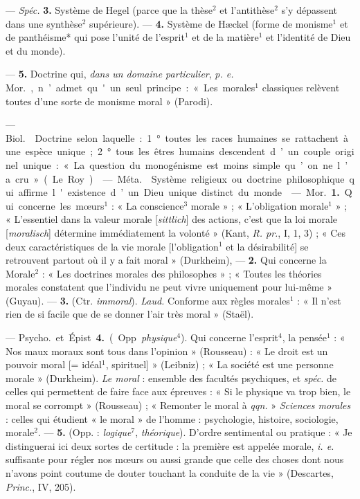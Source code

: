\begin{itemize}[leftmargin=1cm, label=, itemsep=1pt]
— {\it Spéc.} {\bf 3.} Système de Hegel (parce que la thèse$^2$ et
l’antithèse$^2$ s'y dépassent dans une synthèse$^2$ supérieure). — {\bf 4.}
Système de Hæckel (forme de monisme$^1$ et de panthéisme* qui pose l’unité de
l'esprit$^1$ et de la matière$^1$ et l'identité de Dieu et du monde).

— {\bf 5.} Doctrine qui, {\it dans un domaine particulier}, {\it p. e.}
\si{Mor.}, n’admet qu'un seul principe : « Les morales$^1$ classiques
relèvent toutes d’une sorte de monisme moral » (Parodi).

 — \si{Biol.}  Doctrine selon laquelle : 1°
toutes les races humaines se rattachent à une espèce unique; 2° tous les
êtres humains descendent d’un couple originel unique : « La question du
monogénisme est moins simple qu’on ne l’a cru » (Le Roy).

 — \si{Méta.}  Système religieux ou doctrine
philosophique qui affirme l'existence d’un Dieu unique distinct du monde.

 — \si{Mor.} {\bf 1.} Qui concerne les mœurs$^1$ : « La
conscience$^3$ morale » ;
« L'obligation morale$^1$ » ; « L’essentiel dans la valeur morale
[{\it sittlich}] des actions, c’est que la loi morale [{\it moralisch}]
détermine immédiatement la volonté » (Kant, {\it R. pr.}, I, 1, 3) ; « Ces
deux caractéristiques de la vie morale [l’obligation$^1$ et la désirabilité]
se retrouvent partout où il y a fait moral » (Durkheim), — {\bf 2.} Qui
concerne la Morale$^2$ : « Les doctrines morales des philosophes » ; « Toutes
les théories morales constatent que l'individu ne peut vivre uniquement pour
lui-même » (Guyau). — {\bf 3.} (Ctr. {\it immoral}). {\it Laud.} Conforme aux
règles morales$^1$ : « Il n’est rien de si facile que de se donner l'air très
moral » (Staël).

— \si{Psycho.} et Épist. {\bf 4.} (Opp. {\it physique}$^4$). Qui concerne
l’esprit$^4$, la pensée$^1$ : « Nos maux moraux sont tous dans
l'opinion » (Rousseau) : « Le droit est un pouvoir moral [= idéal$^1$,
spirituel] » (Leibniz) ; « La société est une personne morale » (Durkheim).
{\it Le moral} : ensemble des facultés psychiques, et {\it spéc.} de celles
qui permettent de faire face aux épreuves : « Si le physique va trop bien, le
moral se corrompt » (Rousseau) ; « Remonter le moral à {\it qqn.} »
{\it Sciences morales} : celles qui étudient « le moral » de l’homme :
psychologie, histoire, sociologie, morale$^2$. — {\bf 5.} (Opp. :
{\it logique}$^7$, {\it théorique}). D'ordre sentimental ou pratique : « Je
distinguerai ici deux sortes de certitude : la première est appelée morale,
{\it i. e.} suffisante pour régler nos mœurs ou aussi grande que celle des
choses dont nous n'avons point coutume de douter touchant la conduite de la
vie » (Descartes, {\it Princ.}, IV, 205).


\end{itemize}
